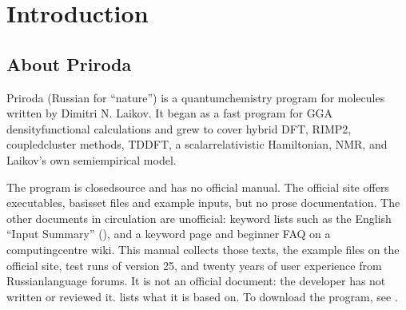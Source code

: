 \documentclass[letterpaper,10pt,english,openany,oneside]{sphinxmanual}
\begin{document}
\part{Introduction}

\sphinxstepscope


\chapter{About Priroda}
\label{\detokenize{start/about:about-priroda}}\label{\detokenize{start/about::doc}}
\sphinxAtStartPar
Priroda (Russian for “nature”) is a quantum\sphinxhyphen{}chemistry program for molecules written by Dimitri N. Laikov.
It began as a fast program for GGA density\sphinxhyphen{}functional calculations and grew to cover hybrid DFT, RI\sphinxhyphen{}MP2,
coupled\sphinxhyphen{}cluster methods, TDDFT, a scalar\sphinxhyphen{}relativistic Hamiltonian, NMR, and Laikov’s own semiempirical model.



\sphinxAtStartPar
The program is closed\sphinxhyphen{}source and has no official manual. The official site offers executables, basis\sphinxhyphen{}set files and
example inputs, but no prose documentation. The other documents in circulation are unofficial: keyword lists such as
the English “Input Summary” (), and a keyword page and beginner FAQ on a computing\sphinxhyphen{}centre wiki. This
manual collects those texts, the example files on the official site, test runs of version 25, and twenty years of
user experience from Russian\sphinxhyphen{}language forums. It is not an official document: the developer has not written or
reviewed it. {\hyperref[\detokenize{sources:sources}]{}} lists what it is based on. To download the program, see {\hyperref[\detokenize{start/running:obtaining-priroda}]{}}.
\end{document}
